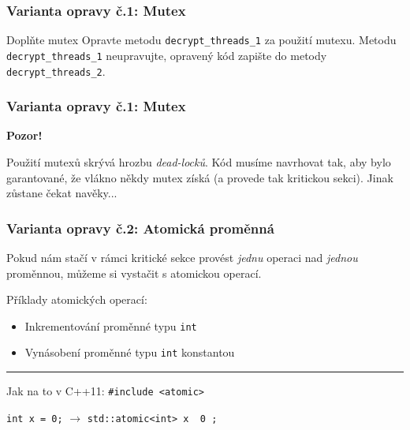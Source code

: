 \documentclass[usenames,dvipsnames,9pt]{beamer}
\begin{document}

{
\begin{frame}[fragile]
  \frametitle{Varianta opravy č.1: Mutex}
  
  \vspace{1em}
  \begin{block}{Doplňte mutex}
    Opravte metodu \texttt{decrypt\_threads\_1} za použití mutexu.
    Metodu \texttt{decrypt\_threads\_1} neupravujte, opravený kód zapište do metody \texttt{decrypt\_threads\_2}.
  \end{block}
\end{frame}
}

\begin{frame}
  \frametitle{Varianta opravy č.1: Mutex}
  {\Large \faWarning \hspace{10pt} \textbf{Pozor!}}
  
  Použití mutexů skrývá hrozbu \emph{dead-locků}.
  Kód musíme navrhovat tak, aby bylo garantované, že vlákno někdy mutex získá (a provede tak kritickou sekci).
  Jinak zůstane čekat navěky...
\end{frame}

\begin{frame}[fragile]
  \frametitle{Varianta opravy č.2: Atomická proměnná}
  Pokud nám stačí v rámci kritické sekce provést \emph{jednu} operaci nad \emph{jednou} proměnnou, můžeme si vystačit s atomickou operací.
  
  \vspace{1em}

  Příklady atomických operací:
  \begin{itemize}
    \item Inkrementování proměnné typu \texttt{int}
    \item Vynásobení proměnné typu \texttt{int} konstantou
  \end{itemize}

  \pause

  \vspace{1em}
  \hrule
  \vspace{1em}

  Jak na to v C++11: \hspace{10pt} \texttt{#include <atomic>}
  \begin{center}
    \texttt{int x = 0;}
    \hspace{20pt}$\rightarrow$\hspace{20pt}
    \texttt{std::atomic<int> x { 0 };}
  \end{center}
\end{frame}
\end{document}

